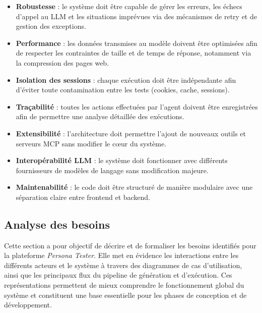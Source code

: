 \begin{itemize}

\item \textbf{Robustesse} : le système doit être capable de gérer les erreurs, les échecs d’appel au LLM et les situations imprévues via des mécanismes de retry et de gestion des exceptions.\\

\item \textbf{Performance} : les données transmises au modèle doivent être optimisées afin de respecter les contraintes de taille et de temps de réponse, notamment via la compression des pages web.\\

\item \textbf{Isolation des sessions} : chaque exécution doit être indépendante afin d’éviter toute contamination entre les tests (cookies, cache, sessions).\\

\item \textbf{Traçabilité} : toutes les actions effectuées par l’agent doivent être enregistrées afin de permettre une analyse détaillée des exécutions.\\

\item \textbf{Extensibilité} : l’architecture doit permettre l’ajout de nouveaux outils et serveurs MCP sans modifier le cœur du système.\\

\item \textbf{Interopérabilité LLM} : le système doit fonctionner avec différents fournisseurs de modèles de langage sans modification majeure.\\

\item \textbf{Maintenabilité} : le code doit être structuré de manière modulaire avec une séparation claire entre frontend et backend.\\

\end{itemize}

\subsection{Analyse des besoins}

Cette section a pour objectif de décrire et de formaliser les besoins identifiés pour la plateforme \textit{Persona Tester}. Elle met en évidence les interactions entre les différents acteurs et le système à travers des diagrammes de cas d’utilisation, ainsi que les principaux flux du pipeline de génération et d’exécution. Ces représentations permettent de mieux comprendre le fonctionnement global du système et constituent une base essentielle pour les phases de conception et de développement.\\

